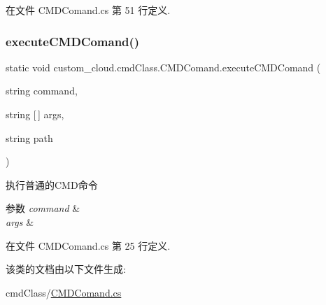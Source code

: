 在文件 C\+M\+D\+Comand.\+cs 第 51 行定义.

\mbox{\label{classcustom__cloud_1_1cmd_class_1_1_c_m_d_comand_a169ec3eaa928aff20c87ee72f217f4fd}} 
\subsubsection{\texorpdfstring{execute\+C\+M\+D\+Comand()}{executeCMDComand()}}
{\footnotesize\ttfamily static void custom\+\_\+cloud.\+cmd\+Class.\+C\+M\+D\+Comand.\+execute\+C\+M\+D\+Comand (\begin{DoxyParamCaption}\item[{string}]{command,  }\item[{string \mbox{[}$\,$\mbox{]}}]{args,  }\item[{string}]{path }\end{DoxyParamCaption})\hspace{0.3cm}{\ttfamily [static]}}



执行普通的\+C\+M\+D命令 


\begin{DoxyParams}{参数}
{\em command} & \\
\hline
{\em args} & \\
\hline
\end{DoxyParams}


在文件 C\+M\+D\+Comand.\+cs 第 25 行定义.



该类的文档由以下文件生成\+:\begin{DoxyCompactItemize}
\item 
cmd\+Class/\hyperlink{_c_m_d_comand_8cs}{C\+M\+D\+Comand.\+cs}\end{DoxyCompactItemize}

